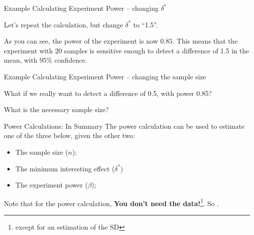 \begin{frame}[fragile]{Example Calculating Experiment Power -- changing $\delta^*$}

  Let's repeat the calculation, but change $\delta^*$ to ``1.5''.

  As you can see, the power of the experiment is now $0.85$. This means that the
  experiment with 20 samples is sensitive enough to detect a difference of 1.5 in
  the mean, with 95\% confidence.
  
\end{frame}

\begin{frame}[fragile]{Example Calculating Experiment Power -- changing the sample size}

  What if we really want to detect a difference of 0.5, with power 0.85?\bigskip

  What is the necessary sample size?
  
\end{frame}

\begin{frame}{Power Calculations: In Summary}{}
  The power calculation can be used to estimate one of the three
  below, \alert{given the other two}:
  \begin{itemize}
  \item The sample size ($n$);
  \item The minimum interesting effect ($\delta^*$)
  \item The experiment power ($\beta$);
  \end{itemize}\bigskip

  Note that for the power calculation, {\bf You don't need the
    data!}\footnote{except for an estimation of the SD}. So
  .
\end{frame}

